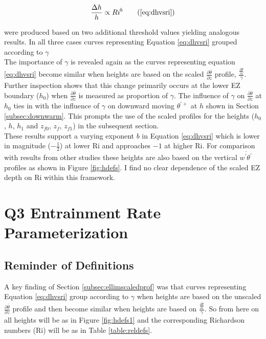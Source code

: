 \begin{equation}
\frac{\Delta h}{h} \propto Ri ^{b} \tag{\ref{eq:dhvsri}}
\end{equation}

were produced based on two additional threshold values yielding analogous results.  In all three cases curves representing Equation \ref{eq:dhvsri} grouped according to $\gamma$\\

The importance of $\gamma$ is revealed again as the curves representing equation \ref{eq:dhvsri} become similar when heights are based on the scaled $\frac{\partial \overline{\theta}}{\partial z}$ profile, $\frac{\frac{\partial \overline{\theta}}{\partial z}}{\gamma}$. Further inspection shows that this change primarily occurs at the lower \acs{EZ} boundary ($h_{0}$) when $\frac{\partial \overline{\theta}}{\partial z}$ is measured as proportion of $\gamma$. The influence of $\gamma$ on $\frac{\partial \overline{\theta}}{\partial z}$ at $h_{0}$ ties in with the influence of $\gamma$ on downward moving $\theta^{'+}$ at $h$ shown in Section \ref{subsec:downwarm}.  This prompts the use of the scaled profiles for the heights ($h_{0}$, $h$, $h_{1}$ and $z_{f0}$, $z_{f}$, $z_{f1}$) in the subsequent section.\\

These results support a varying exponent $b$ in Equation \ref{eq:dhvsri} which is lower in magnitude ($-\frac{1}{2}$) at lower \acs{Ri} and approaches $-1$ at higher \acs{Ri}.  For comparison with results from other studies these heights are also based on the vertical $\overline{w^{'}\theta^{'}}$ profiles as shown in Figure \ref{fig:hdefs}. I find no clear dependence of the scaled \acs{EZ} depth on \acs{Ri} within this framework. \\

\clearpage

\section{Q3 Entrainment Rate Parameterization}
\label{sec:weri}
\FloatBarrier


\subsection{Reminder of Definitions}

A key finding of Section \ref{subsec:ellimscaledprof} was that curves representing Equation \ref{eq:dhvsri} group according
to $\gamma$ when heights are based on the unscaled $\frac{\partial \overline{\theta}}{\partial z}$ profile and then become similar
when heights are based on $\frac{\frac{\partial \overline{\theta}}{\partial z}}{\gamma}$.  So from here on all heights will be as in
Figure \ref{fig:hdefs1} and the corresponding Richardson numbers (\acs{Ri}) will be as in Table \ref{table:reldefs}.\\ 

